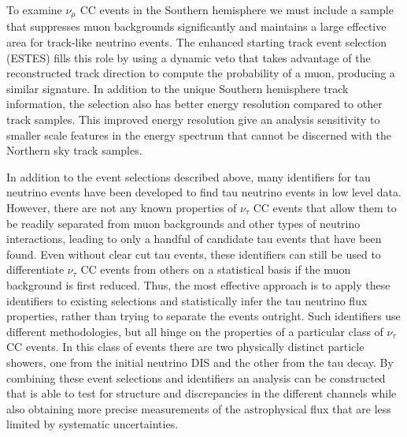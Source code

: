 To examine $\nu_\mu$ CC events in the Southern hemisphere we must include a sample that suppresses muon backgrounds significantly and maintains a large effective area for track-like neutrino events.
The enhanced starting track event selection (ESTES) fills this role by using a dynamic veto that takes advantage of the reconstructed track direction to compute the probability of a muon, producing a similar signature.
In addition to the unique Southern hemisphere track information, the selection also has better energy resolution compared to other track samples.
This improved energy resolution give an analysis sensitivity to smaller scale features in the energy spectrum that cannot be discerned with the Northern sky track samples.

In addition to the event selections described above, many identifiers for tau neutrino events have been developed to find tau neutrino events in low level data.
However, there are not any known properties of $\nu_\tau$ CC events that allow them to be readily separated from muon backgrounds and other types of neutrino interactions, leading to only a handful of candidate tau events that have been found.
Even without clear cut tau events, these identifiers can still be used to differentiate $\nu_\tau$ CC events from others on a statistical basis if the muon background is first reduced.
Thus, the most effective approach is to apply these identifiers to existing selections and statistically infer the tau neutrino flux properties, rather than trying to separate the events outright.
Such identifiers use different methodologies, but all hinge on the properties of a particular class of $\nu_\tau$ CC events.
In this class of events there are two physically distinct particle showers, one from the initial neutrino DIS and the other from the tau decay.
By combining these event selections and identifiers an analysis can be constructed that is able to test for structure and discrepancies in the different channels while also obtaining more precise measurements of the astrophysical flux that are less limited by systematic uncertainties.

